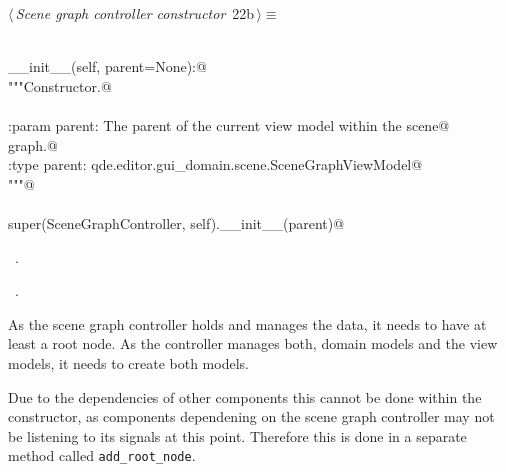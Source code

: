 \documentclass[
    a4paper,      %
    10pt,         %
    openright,    %
    notitlepage,  %
    parskip=half, %
]{scrreprt}       %
\theoremstyle{definition}                    %
\begin{document}
\begin{flushleft} \small
\begin{minipage}{\linewidth}\label{scrap17}\raggedright\small
{} $\langle\,${\itshape Scene graph controller constructor}\nobreak\ {\footnotesize {22b}}$\,\rangle\equiv$
\vspace{-1exm}
\begin{list}{}{} \item
\mbox{}\lstinline@@\\
\mbox{}\lstinline@def __init__(self, parent=None):@\\
\mbox{}\lstinline@    """Constructor.@\\
\mbox{}\lstinline@@\\
\mbox{}\lstinline@    :param parent: The parent of the current view model within the scene@\\
\mbox{}\lstinline@                    graph.@\\
\mbox{}\lstinline@    :type parent:  qde.editor.gui_domain.scene.SceneGraphViewModel@\\
\mbox{}\lstinline@    """@\\
\mbox{}\lstinline@@\\
\mbox{}\lstinline@    super(SceneGraphController, self).__init__(parent)@\\
\mbox{}\lstinline@@{\NWsep}
\end{list}
\vspace{-1.5ex}
\footnotesize
\begin{list}{}{\setlength{\itemsep}{-\parsep}\setlength{\itemindent}{-\leftmargin}}
\item \NWtxtMacroDefBy\ .
\item \NWtxtMacroRefIn\ .

\item{}
\end{list}
\end{minipage}\vspace{4ex}
\end{flushleft}
As the scene graph controller holds and manages the data, it needs to have at
least a root node. As the controller manages both, domain models and the view
models, it needs to create both models.

Due to the dependencies of other components this cannot be done within the
constructor, as components dependening on the scene graph controller may not be
listening to its signals at this point. Therefore this is done in a separate
method called \verb+add_root_node+.
\end{document}

